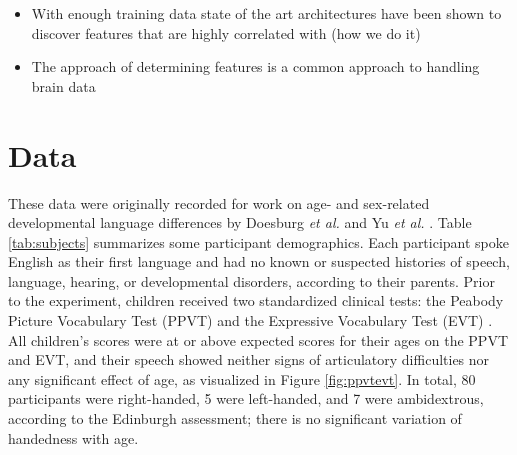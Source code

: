 \documentclass[utf8]{frontiersSCNS} %
\begin{document}

\begin{itemize}
\item With enough training data state of the art architectures have been shown to discover features that are highly correlated with (how we do it)
  \item The approach of determining features is a common approach to handling brain data
\end{itemize}

\section{Data}

These data were originally recorded for work on age- and sex-related developmental language differences by Doesburg \emph{et al.} and Yu \emph{et al.} \cite{Doesburg2016, Yu2014}. Table \ref{tab:subjects} summarizes some participant demographics. Each participant spoke English as their first language and had no known or suspected histories of speech, language, hearing, or developmental disorders, according to their parents. Prior to the experiment, children received two standardized clinical tests: the Peabody Picture Vocabulary Test (PPVT) \cite{Dunn97} and the Expressive Vocabulary Test (EVT) \cite{EVT}. All children's scores were at or above expected scores for their ages on the PPVT and EVT, and their speech showed neither signs of articulatory difficulties nor any significant effect of age, as visualized in Figure \ref{fig:ppvtevt}. In total, 80 participants were right-handed, 5 were left-handed, and 7 were ambidextrous, according to the Edinburgh assessment; there is no significant variation of handedness with age.

\end{document}
